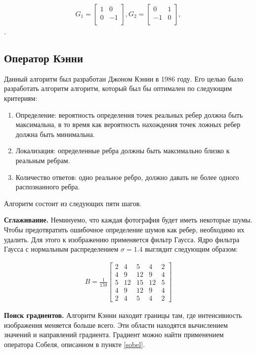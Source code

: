 \begin{gather}
G_{1}=
\begin{bmatrix} 
	1 & 0 \\ 
	0 & -1 \\ 
\end{bmatrix},
G_{2}=
\begin{bmatrix} 
	0 & 1 \\ 
	-1 & 0 \\ 
\end{bmatrix},
\end{gather}.

\subsection{Оператор Кэнни}
Данный алгоритм был разработан Джоном Кэнии в 1986 году. Его целью было разработать алгоритм алгоритм, который был бы оптимален по следующим критериям:
\begin{enumerate}
	\item Определение: вероятность определения точек реальных ребер должна быть максимальна, в то время как вероятность нахождения точек ложных ребер должна быть минимальна.
	\item Локализация: определенные ребра должны быть максимально близко к реальным ребрам.
	\item Количество ответов: одно реальное ребро, должно давать не более одного распознанного ребра.
\end{enumerate}
Алгоритм состоит из следующих пяти шагов.

\textbf{Сглаживание.} Неминуемо, что каждая фотография будет иметь некоторые шумы. Чтобы предотвратить ошибочное определение шумов как ребер, необходимо их удалить. Для этого к изображению применяется фильтр Гаусса. 
Ядро фильтра Гаусса с нормальным распределением \(\sigma = 1.4\) выглядит следующим образом:

\begin{gather} {B} ={\frac {1}{159}}{\begin{bmatrix}2&4&5&4&2\\4&9&12&9&4\\5&12&15&12&5\\4&9&12&9&4\\2&4&5&4&2\end{bmatrix}} \end{gather}

\textbf{Поиск градиентов.} 
Алгоритм Кэнни находит границы там, где интенсивность изображения меняется больше всего. Эти области находятся вычислением значений и направлений градиента. Градиент можно найти применением оператора Собеля, описанном в пункте \ref{sobel}.

